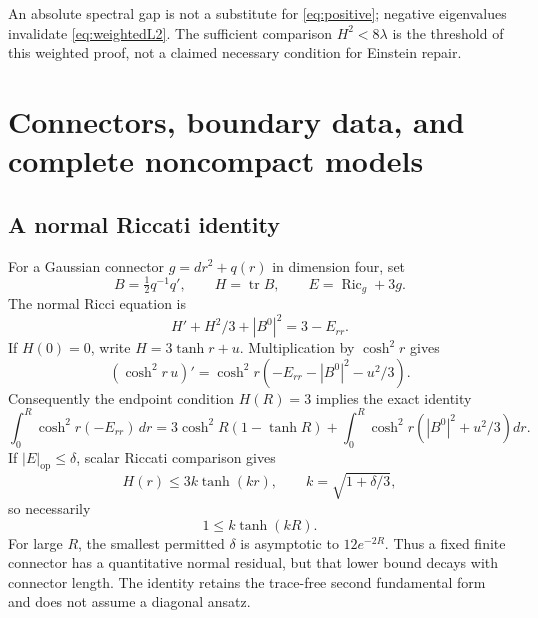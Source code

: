 \documentclass[11pt,a4paper]{article}
\theoremstyle{definition}\newtheorem{definition}[theorem]{Definition}
\theoremstyle{remark}\newtheorem{remark}[theorem]{Remark}
\DeclareMathOperator{\Ric}{Ric}
\DeclareMathOperator{\tr}{tr}
\newcommand{\op}{\mathrm{op}}
\begin{document}
An absolute spectral gap is not a substitute for \eqref{eq:positive}; negative eigenvalues invalidate \eqref{eq:weightedL2}. The sufficient comparison $H^2<8\lambda$ is the threshold of this weighted proof, not a claimed necessary condition for Einstein repair.

\section{Connectors, boundary data, and complete noncompact models}
\subsection{A normal Riccati identity}
For a Gaussian connector $g=dr^2+q(r)$ in dimension four, set
\[
 B=\tfrac12q^{-1}q',\qquad H=\tr B,\qquad E=\Ric_g+3g.
\]
The normal Ricci equation is
\begin{equation}\label{eq:Riccati}
 H'+H^2/3+|B^0|^2=3-E_{rr}.
\end{equation}
If $H(0)=0$, write $H=3\tanh r+u$. Multiplication by $\cosh^2r$ gives
\[
 (\cosh^2r\,u)'=\cosh^2r\left(-E_{rr}-|B^0|^2-u^2/3\right).
\]
Consequently the endpoint condition $H(R)=3$ implies the exact identity
\begin{equation}\label{eq:connector-integral}
 \int_0^R\cosh^2r(-E_{rr})\,dr
 =3\cosh^2R(1-\tanh R)
  +\int_0^R\cosh^2r\left(|B^0|^2+u^2/3\right)dr.
\end{equation}
If $|E|_\op\le\delta$, scalar Riccati comparison gives
\[
 H(r)\le3k\tanh(kr),\qquad k=\sqrt{1+\delta/3},
\]
so necessarily
\begin{equation}\label{eq:connector-lower}
 1\le k\tanh(kR).
\end{equation}
For large $R$, the smallest permitted $\delta$ is asymptotic to $12e^{-2R}$. Thus a fixed finite connector has a quantitative normal residual, but that lower bound decays with connector length. The identity retains the trace-free second fundamental form and does not assume a diagonal ansatz.
\end{document}
